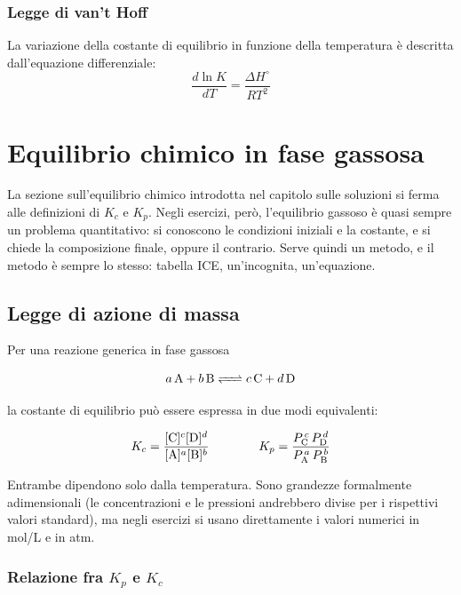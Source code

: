 \documentclass[11pt, a4paper, openright]{book}
\begin{document}
\subsection{Legge di van't Hoff}
La variazione della costante di equilibrio in funzione della temperatura è descritta dall'equazione differenziale:
\begin{equation}
\frac{d \ln K}{dT} = \frac{\Delta H^\circ}{RT^2}
\end{equation}


\chapter{Equilibrio chimico in fase gassosa}

La sezione sull'equilibrio chimico introdotta nel capitolo sulle soluzioni si ferma alle
definizioni di $K_c$ e $K_p$. Negli esercizi, però, l'equilibrio gassoso è quasi sempre un
problema quantitativo: si conoscono le condizioni iniziali e la costante, e si chiede la
composizione finale, oppure il contrario. Serve quindi un metodo, e il metodo è sempre lo
stesso: tabella ICE, un'incognita, un'equazione.

\section{Legge di azione di massa}

Per una reazione generica in fase gassosa

\begin{equation*}
  \ce{$a$ A + $b$ B <=> $c$ C + $d$ D}
\end{equation*}

la costante di equilibrio può essere espressa in due modi equivalenti:

\begin{equation}
  K_c = \frac{[\ce{C}]^c [\ce{D}]^d}{[\ce{A}]^a [\ce{B}]^b}
  \qquad\qquad
  K_p = \frac{P_{\ce{C}}^{\,c} \, P_{\ce{D}}^{\,d}}{P_{\ce{A}}^{\,a} \, P_{\ce{B}}^{\,b}}
\end{equation}

Entrambe dipendono solo dalla temperatura. Sono grandezze formalmente adimensionali
(le concentrazioni e le pressioni andrebbero divise per i rispettivi valori standard), ma
negli esercizi si usano direttamente i valori numerici in mol/L e in atm.

\subsection{Relazione fra $K_p$ e $K_c$}
\end{document}
